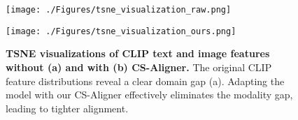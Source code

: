 \begin{figure}[t] %
    \centering
    \begin{minipage}{0.24\textwidth}
        \centering
\texttt{[image: ./Figures/tsne\_visualization\_raw.png]}
        \vspace{-6mm}
        \label{fig:tsne-wo-alignment}
    \end{minipage}%
    \hfill
    \begin{minipage}{0.24\textwidth}
        \centering        \texttt{[image: ./Figures/tsne\_visualization\_ours.png]}
        \vspace{-6mm}
        \label{fig:tsne-with-alignment}
    \end{minipage}
\vspace{-2.5mm}
\caption{\textbf{ 
TSNE visualizations of CLIP text and image features without (a) and with (b) CS-Aligner.} The original CLIP feature distributions reveal a clear domain gap (a). Adapting the model with our CS-Aligner effectively eliminates the modality gap, leading to tighter alignment. 
}
\vspace{-6mm}
\end{figure}


